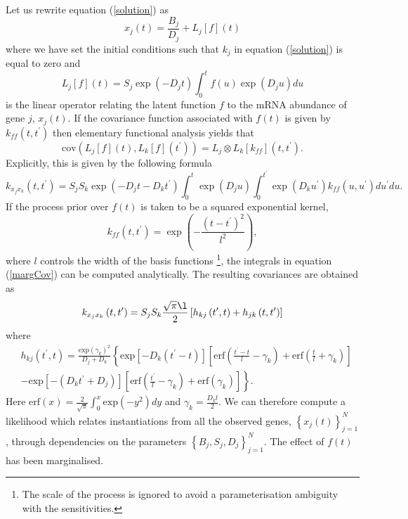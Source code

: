 \documentclass[english]{article}
\begin{document}
Let us rewrite equation (\ref{solution}) as\[
x_j\left(t\right) = \frac{B_j}{D_j}+L_j\left[f\right]\left(t\right)\]
where we have set the initial conditions such that $k_j$ in equation 
(\ref{solution}) is equal to zero and
\begin{equation}L_j\left[f\right]\left(t\right) = S_{j}
\exp\left(-D_{j}t\right)\int_{0}^{t}f\left(u\right)\exp\left(D_{j}u\right)du
\label{operators}\end{equation}
is the linear operator relating the latent function $f$ to the mRNA abundance
of gene $j$, $x_j\left(t\right)$.  
If the covariance function associated with $f\left(t\right)$ is given
by $k_{ff}\left(t,t^{\prime}\right)$ then elementary functional analysis
yields that \[
\textrm{cov}\left(L_j\left[f\right]\left(t\right),L_k\left[f\right]\left(
t^\prime\right)\right) = L_j\otimes L_k\left[k_{ff}\right]\left(t, t^\prime
\right).\]
Explicitly, this is given by the following formula \begin{equation}
k_{x_{j}x_{k}}\left(t,t^{\prime}\right) =  S_{j}S_{k}\exp\left(-D_{j}t-D_{k}t^{\prime}\right)\int_{0}^{t}\exp\left(D_{j}u\right)\int_{0}^{t^{\prime}}\exp\left(D_{k}u^{\prime}\right)k_{ff}\left(u,u^{\prime}\right)du^{\prime}du.
\label{margCov}\end{equation} 
If the process prior over $f\left(t\right)$
is taken to be a squared exponential kernel, \[
k_{ff}\left(t,t^{\prime}\right) = \exp\left(-\frac{\left(t-t^{\prime}\right)^{2}}{l^{2}}\right),\]
where $l$ controls the width of the basis functions%
\footnote{The scale of the process is ignored to avoid a parameterisation ambiguity
with the sensitivities.%
}, the integrals in equation (\ref{margCov}) can be computed analytically.
The resulting covariances are obtained as
\begin{equation}
k_{x_jx_k}\left( t,t^{\prime}\right) = S_jS_k\frac{\sqrt{\pi}\l}{2} 
\left[h_{kj}\left(t^{\prime},t\right)+h_{jk}\left(t,t^{\prime}\right)\right]
\end{equation} 
where \begin{equation*}\begin{split}
&h_{kj}\left(t^{\prime},t\right) =
\frac{\textrm{exp}\left(\gamma_k\right)^2}{D_j+D_k}
\left\{\textrm{exp}\left[-D_k\left(t^{\prime}-t\right)\right]
\left[\textrm{erf}\left(\frac{t^{\prime}-t}{l}-\gamma_k\right)+\textrm{erf}\left(\frac{t}{l}+\gamma_k\right)\right]\right. \\
&\left. -\textrm{exp}\left[-\left(D_kt^{\prime}+D_j\right)\right]\left[\textrm{erf}\left(\frac{t^{\prime}}{l}-\gamma_k\right)+\textrm{erf}\left(\gamma_k\right)\right]\right\}.
\end{split}\end{equation*}
Here $\textrm{erf}(x) = \frac{2}{\sqrt{\pi}}\int_0^x\textrm{exp}\left(-y^2\right)dy$ and 
$\gamma_k=\frac{D_kl}{2}$. 
We can therefore
compute a likelihood which relates instantiations from all the observed
genes, $\left\{ x_{j}\left(t\right)\right\} _{j=1}^{N}$, through
dependencies on the parameters $\left\{ B_{j},S_{j},D_{j}\right\} _{j=1}^{N}$.
The effect of $f\left(t\right)$ has been marginalised. 
\end{document}
